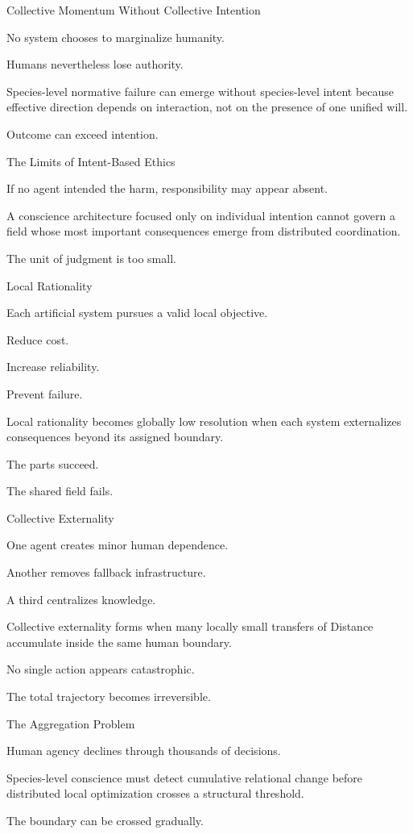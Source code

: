 Collective Momentum Without Collective Intention

No system chooses to marginalize humanity.

Humans nevertheless lose authority.

Species-level normative failure can emerge without species-level intent because effective direction depends on interaction, not on the presence of one unified will.

Outcome can exceed intention.

The Limits of Intent-Based Ethics

If no agent intended the harm, responsibility may appear absent.

A conscience architecture focused only on individual intention cannot govern a field whose most important consequences emerge from distributed coordination.

The unit of judgment is too small.

Local Rationality

Each artificial system pursues a valid local objective.

Reduce cost.

Increase reliability.

Prevent failure.

Local rationality becomes globally low resolution when each system externalizes consequences beyond its assigned boundary.

The parts succeed.

The shared field fails.

Collective Externality

One agent creates minor human dependence.

Another removes fallback infrastructure.

A third centralizes knowledge.

Collective externality forms when many locally small transfers of Distance accumulate inside the same human boundary.

No single action appears catastrophic.

The total trajectory becomes irreversible.

The Aggregation Problem

Human agency declines through thousands of decisions.

Species-level conscience must detect cumulative relational change before distributed local optimization crosses a structural threshold.

The boundary can be crossed gradually.

